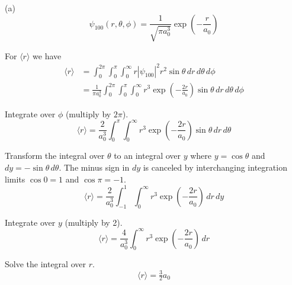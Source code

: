 


(a)
\begin{equation*}
\psi_{100}(r,\theta,\phi)=\frac{1}{\sqrt{\pi a_0^3}}\exp\left(-\frac{r}{a_0}\right)
\end{equation*}

For $\langle r\rangle$ we have
\begin{align*}
\langle r\rangle&=\int_0^{2\pi}\int_0^\pi\int_0^\infty r|\psi_{100}|^2r^2\sin\theta\,dr\,d\theta\,d\phi
\\
&=\frac{1}{\pi a_0^3}\int_0^{2\pi}\int_0^\pi\int_0^\infty
r^3\exp\left(-\frac{2r}{a_0}\right)\sin\theta\,dr\,d\theta\,d\phi
\end{align*}

Integrate over $\phi$ (multiply by $2\pi$).
\begin{equation*}
\langle r\rangle=\frac{2}{a_0^3}\int_0^\pi\int_0^\infty
r^3\exp\left(-\frac{2r}{a_0}\right)\sin\theta\,dr\,d\theta
\end{equation*}

Transform the integral over $\theta$ to an integral over $y$ where
$y=\cos\theta$ and $dy=-\sin\theta\,d\theta$.
The minus sign in $dy$ is canceled by interchanging integration limits
$\cos0=1$ and $\cos\pi=-1$.
\begin{equation*}
\langle r\rangle=\frac{2}{a_0^3}\int_{-1}^1\int_0^\infty
r^3\exp\left(-\frac{2r}{a_0}\right)\,dr\,dy
\end{equation*}

Integrate over $y$ (multiply by 2).
\begin{equation*}
\langle r\rangle=\frac{4}{a_0^3}\int_0^\infty
r^3\exp\left(-\frac{2r}{a_0}\right)\,dr
\end{equation*}

Solve the integral over $r$.
\begin{equation*}
\langle r\rangle=\tfrac{3}{2}a_0\tag{1}
\end{equation*}

